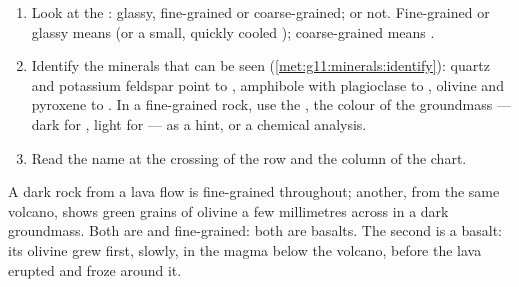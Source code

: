 
\begin{method}\label{met:g11:igneous-rocks:naming}
\begin{enumerate}
  \item Look at the : glassy, fine-grained or coarse-grained;
         or not. Fine-grained or glassy means  (or a
        small, quickly cooled ); coarse-grained means .
  \item Identify the minerals that can be seen
        (\cref{met:g11:minerals:identify}): quartz and potassium feldspar
        point to , amphibole with plagioclase to , olivine
        and pyroxene to . In a fine-grained rock, use the ,
        the colour of the groundmass --- dark for , light for  ---
        as a hint, or a chemical analysis.
  \item Read the name at the crossing of the row and the column of the
        chart.
\end{enumerate}
\end{method}

\begin{example}
A dark rock from a lava flow is fine-grained throughout; another, from the
same volcano, shows green grains of olivine a few millimetres across in a
dark groundmass. Both are  and fine-grained: both are basalts. The
second is a  basalt: its olivine grew first, slowly, in the
magma below the volcano, before the lava erupted and froze around it.
\end{example}

